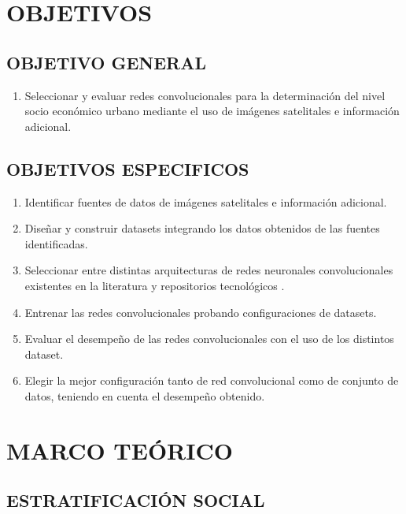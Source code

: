 \newpage\chapter{OBJETIVOS} 

	\section{OBJETIVO GENERAL}
		\begin{enumerate}
		\item Seleccionar y evaluar redes convolucionales para la determinación del nivel socio económico urbano mediante el uso de imágenes satelitales e información adicional.
		\end{enumerate}

	\section{OBJETIVOS ESPECIFICOS}
	    \begin{enumerate}
	      \item Identificar fuentes de datos de imágenes satelitales e información adicional.
	      \item Diseñar y construir datasets integrando los datos obtenidos de las fuentes identificadas.
	      \item Seleccionar entre distintas arquitecturas de redes neuronales convolucionales existentes en la literatura y repositorios tecnológicos    .
	      \item Entrenar las redes convolucionales probando configuraciones de datasets.
	      \item Evaluar el desempeño de las redes convolucionales con el uso de los distintos dataset. 
	      \item Elegir la mejor configuración tanto de red convolucional como de conjunto de datos, teniendo en cuenta el desempeño obtenido.   
	    \end{enumerate}


\newpage\chapter{MARCO TEÓRICO}    
     
    
	\section{ESTRATIFICACIÓN SOCIAL}
    

